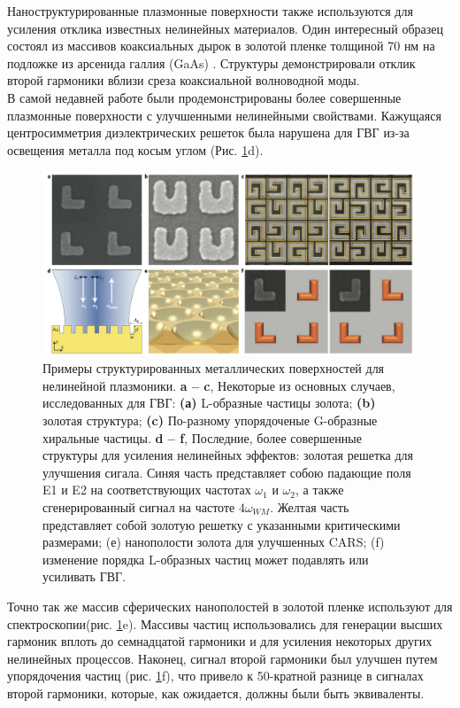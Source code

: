 Наноструктурированные плазмонные поверхности также используются для усиления отклика известных нелинейных материалов. Один интересный образец состоял из массивов коаксиальных дырок в золотой пленке толщиной 70 нм на подложке из арсенида галлия (GaAs)  \cite{fan2006second}. Структуры демонстрировали отклик второй гармоники вблизи среза коаксиальной волноводной моды.
\\
\hspace*{2mm}
В самой недавней работе были продемонстрированы более совершенные плазмонные поверхности с улучшенными нелинейными свойствами. Кажущаяся центросимметрия диэлектрических решеток была нарушена для ГВГ из-за освещения металла под косым углом \cite{genevet2010large} (Рис. \ref{mettals}d). 
\begin{figure}[h!]
	\centering
	\includegraphics[width=0.9\linewidth]{images/mettals.png}
	\caption{Примеры структурированных металлических поверхностей для нелинейной плазмоники. \textbf{a – c}, Некоторые из основных случаев, исследованных для ГВГ: \textbf{(а)} L-образные частицы золота; \textbf{(b) }золотая структура; \textbf{(c)} По-разному упорядоченые G-образные хиральные частицы. \textbf{d – f},  Последние, более совершенные структуры для усиления нелинейных эффектов: золотая решетка для улучшения сигала. Синяя часть представляет собою падающие поля E1 и E2 на соответствующих частотах $\omega_1$ и $\omega_2$, а также сгенерированный сигнал на частоте $4\omega_{WM}$. Желтая часть представляет собой золотую решетку с указанными критическими размерами; (е) нанополости золота для улучшенных CARS; (f) изменение порядка L-образных частиц может подавлять или усиливать ГВГ.}
	\label{mettals}
\end{figure}
Точно так же массив сферических нанополостей в золотой пленке используют для спектроскопии(рис. \ref{mettals}e). Массивы частиц использовались для генерации высших гармоник вплоть до семнадцатой гармоники \cite{kim2008high} и для усиления некоторых других нелинейных процессов. Наконец, сигнал второй гармоники  был улучшен путем упорядочения частиц (рис. \ref{mettals}f), что привело к 50-кратной разнице в сигналах второй гармоники, которые, как ожидается, должны были быть эквиваленты.

